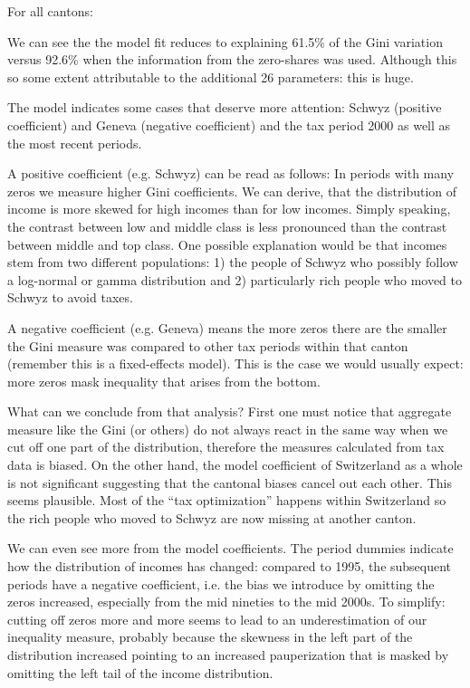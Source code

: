 \documentclass[twoside]{article}\usepackage[]{graphicx}\usepackage[]{color}
\begin{document}
\begin{multicols}{2}
For all cantons:



We can see the the model fit reduces to explaining 61.5\% of the Gini variation versus 92.6\% when the information from the zero-shares was used. Although this so some extent attributable to the additional 26 parameters: this is huge. 

The model indicates some cases that deserve more attention: Schwyz (positive coefficient) and Geneva (negative coefficient) and the tax period 2000 as well as the most recent periods.

A positive coefficient (e.g. Schwyz) can be read as follows: In periods with many zeros we measure higher Gini coefficients. We can derive, that the distribution of income is more skewed for high incomes than for low incomes. Simply speaking, the contrast between low and middle class is less pronounced than the contrast between middle and top class. One possible explanation would be that incomes stem from two different populations: 1) the people of Schwyz who possibly follow a log-normal or gamma distribution and 2) particularly rich people who moved to Schwyz to avoid taxes. 

A negative coefficient (e.g. Geneva) means the more zeros there are the smaller the Gini measure was compared to other tax periods within that canton (remember this is a fixed-effects model). This is the case we would usually expect: more zeros mask inequality that arises from the bottom.

What can we conclude from that analysis? First one must notice that aggregate measure like the Gini (or others) do not always react in the same way when we cut off one part of the distribution, therefore the measures calculated from tax data is biased. On the other hand, the model coefficient of Switzerland as a whole is not significant suggesting that the cantonal biases cancel out each other. This seems plausible. Most of the ``tax optimization'' happens within Switzerland so the rich people who moved to Schwyz are now missing at another canton.

We can even see more from the model coefficients. The period dummies indicate how the distribution of incomes has changed: compared to 1995, the subsequent periods have a negative coefficient, i.e. the bias we introduce by omitting the zeros increased, especially from the mid nineties to the mid 2000s. To simplify: cutting off zeros more and more seems to lead to an underestimation of our inequality measure, probably because the skewness in the left part of the distribution increased pointing to an increased pauperization that is masked by omitting the left tail of the income distribution.





\end{multicols}
\end{document}
